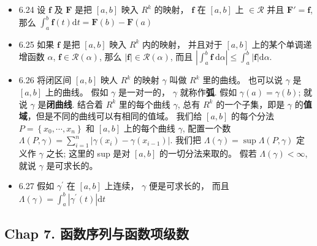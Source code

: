 \begin{itemize}
\item 6.24 设 $\boldsymbol{f}$ 及 $\boldsymbol{F}$ 是把 $[a, b]$ 映入 $R^{k}$ 的映射， $\boldsymbol{f}$ 在 $[a, b]$ 上 $\in \mathscr{R}$ 并且 $\boldsymbol F'=\boldsymbol f$, 那么 $\int_{a}^{b} \boldsymbol{f}(t) \mathrm{d} t=\boldsymbol{F}(b)-\boldsymbol{F}(a)$

\item 6.25 如果 $\boldsymbol f$ 是把 $[a, b]$ 映入 $R^{k}$ 内的映射， 并且对于 $[a, b]$ 上的某个单调递增函数 $\alpha$, $\boldsymbol f \in \mathscr{R}(\alpha)$, 那么 $|\boldsymbol f| \in \mathscr{R}(\alpha)$, 而且 $\left|\int_{a}^{b} \boldsymbol f \mathrm{~d} \alpha\right| \leqslant \int_{a}^{b}|\boldsymbol f| \mathrm{d} \alpha$.

\item 6.26 将闭区间 $[a, b]$ 映人 $R^{k}$ 的映射 $\gamma$ 叫做 $R^{k}$ 里的曲线。 也可以说 $\gamma$ 是 $[a , b]$ 上的曲线。 假如 $\gamma$ 是一对一的， $\gamma$ 就称作\textbf{弧}. 假如 $\gamma(a)=\gamma(b)$; 就说 $\gamma$ 是\textbf{闭曲线}. 结合着 $R^{k}$ 里的每个曲线 $\gamma$, 总有 $R^{k}$ 的一个子集，即是 $\gamma$ 的\textbf{值域}，但是不同的曲线可以有相同的值域。
我们给 $[a, b]$ 的每个分法 $P=\left\{x_{0}, \cdots, x_{n}\right\}$ 和 $[a, b]$ 上的每个曲线 $\gamma$, 配置一个数 $\Lambda(P, \gamma)=\sum_{i=1}^{n}\left|\gamma\left(x_{i}\right)-\gamma\left(x_{i-1}\right)\right|$. 我们把 $\Lambda(\gamma)=\sup \Lambda(P, \gamma)$
定义作 $\gamma$ 之长; 这里的 sup 是对 $[a, b]$ 的一切分法来取的。 假若 $\Lambda(\gamma)<\infty$, 就说 $\gamma$ 是可求长的。

\item 6.27 假如 $\gamma^{\prime}$ 在 $[a, b]$ 上连续， $\gamma$ 便是可求长的， 而且 $\Lambda(\gamma)=\int_{a}^{b}\left|\gamma^{\prime}(t)\right| \mathrm{d} t$
\end{itemize}

\subsection{Chap 7. 函数序列与函数项级数}

